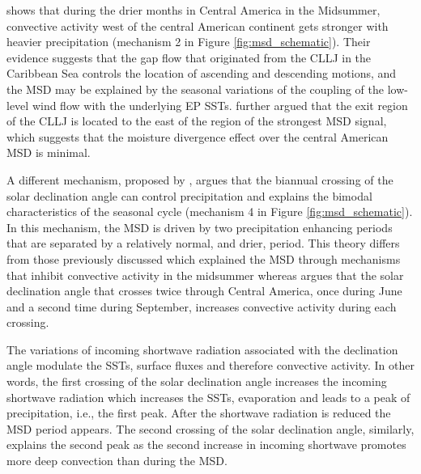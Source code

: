     
 \cite{herrera2015} shows that during the drier months in Central America in the Midsummer, convective activity west of the central American continent gets stronger with heavier precipitation (mechanism 2 in Figure \ref{fig:msd_schematic}).  Their evidence suggests that the gap flow that originated from the CLLJ in the Caribbean Sea controls the location of ascending and descending motions, and the MSD may be explained by the seasonal variations of the coupling of the low-level wind flow with the underlying EP SSTs.
\cite{herrera2015} further argued that the exit region of the CLLJ is located to the east of the region of the strongest MSD signal, which suggests that the moisture divergence effect over the central American MSD is minimal. 



A different mechanism, proposed by \cite{karnauskas2013}, argues that the biannual crossing of the solar declination angle can control precipitation and explains the bimodal characteristics of the seasonal cycle (mechanism 4 in Figure \ref{fig:msd_schematic}). In this mechanism, the MSD is driven by two precipitation enhancing periods that are separated by a relatively normal, and drier, period. This theory differs from those previously discussed which explained the MSD through mechanisms that inhibit convective activity in the midsummer whereas \cite{karnauskas2013} argues that the solar declination angle that crosses twice through Central America, once during June and a second time during September, increases convective activity during each crossing. 

The variations of incoming shortwave radiation associated with the declination angle modulate the SSTs, surface fluxes and therefore convective activity. In other words, the first crossing of the solar declination angle increases the incoming shortwave radiation which increases the SSTs, evaporation and leads to a peak of precipitation, i.e., the first peak. After the shortwave radiation is reduced the MSD period appears. The second crossing of the solar declination angle, similarly, explains the second peak as the second increase in incoming shortwave promotes more deep convection than during the MSD. 



